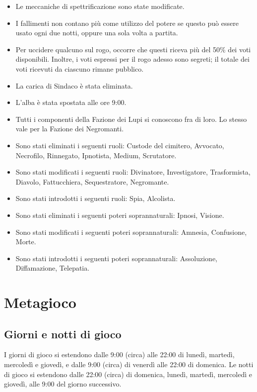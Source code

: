 \documentclass[a4paper,10pt]{article}
\begin{document}
\begin{itemize}
	\item Le meccaniche di spettrificazione sono state modificate.
	\item I fallimenti non contano più come utilizzo del potere se questo può essere usato ogni due notti, oppure una sola volta a partita.
	\item Per uccidere qualcuno sul rogo, occorre che questi riceva più del 50\% dei voti disponibili. Inoltre, i voti espressi per il rogo adesso sono segreti; il totale dei voti ricevuti da ciascuno rimane pubblico.
	\item La carica di Sindaco è stata eliminata.
	\item L'alba è stata spostata alle ore 9:00.
	\item Tutti i componenti della Fazione dei Lupi si conoscono fra di loro. Lo stesso vale per la Fazione dei Negromanti.
	\item Sono stati eliminati i seguenti ruoli: Custode del cimitero, Avvocato, Necrofilo, Rinnegato, Ipnotista, Medium, Scrutatore.
	\item Sono stati modificati i seguenti ruoli: Divinatore, Investigatore, Trasformista, Diavolo, Fattucchiera, Sequestratore, Negromante.
	\item Sono stati introdotti i seguenti ruoli: Spia, Alcolista.
	\item Sono stati eliminati i seguenti poteri soprannaturali: Ipnosi, Visione.
	\item Sono stati modificati i seguenti poteri soprannaturali: Amnesia, Confusione, Morte.
	\item Sono stati introdotti i seguenti poteri soprannaturali: Assoluzione, Diffamazione, Telepatia.
\end{itemize}

\pagebreak

\section{Metagioco}

\subsection{Giorni e notti di gioco}

I giorni di gioco si estendono dalle 9:00 (circa) alle 22:00 di lunedì, martedì, mercoledì e giovedì, e dalle 9:00 (circa) di venerdì alle 22:00 di domenica. Le notti di gioco si estendono dalle 22:00 (circa) di domenica, lunedì, martedì, mercoledì e giovedì, alle 9:00 del giorno successivo.
\end{document}
